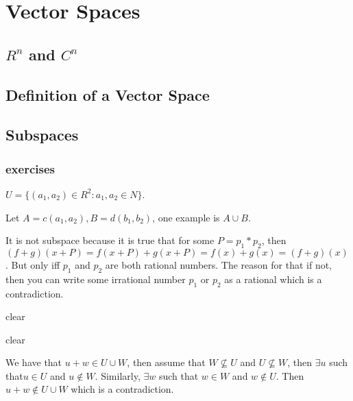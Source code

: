 \chapter{Vector Spaces}

\section{$R^n$ and $C^n$}

\section{Definition of a Vector Space}

\section{Subspaces}

\subsection{exercises}

\begin{exercise}{7}
    $U = \{(a_1, a_2) \in R^2 : a_1, a_2 \in N\}$.
\end{exercise}

\begin{exercise}{8}
    Let $A = c(a_1, a_2), B = d(b_1, b_2)$, one example is $A \cup B$.
\end{exercise}

\begin{exercise}{9}
     It is not subspace because it is true that for some $P = p_1*p_2$, then $(f + g)(x + P) = f(x + P) + g(x + P) = f(x) + g(x) = (f + g)(x)$. But only iff $p_1$ and $p_2$ are both rational numbers. The reason for that if not, then you can write some irrational number $p_1$ or $p_2$ as a rational which is a contradiction.
\end{exercise}

\begin{exercise}{10}
     clear
\end{exercise}

\begin{exercise}{11}
    clear
\end{exercise}

\begin{exercise}{12}
    We have that $u + w \in U \cup W$, then assume that $W \nsubseteq U$ and $U \nsubseteq W$, then $\exists u$ such that$u \in U$ and $u \notin W$. Similarly,  $\exists w$ such that $w \in W$ and $w \notin U$. Then $u + w \notin U \cup W$ which is a contradiction.
\end{exercise}

 

